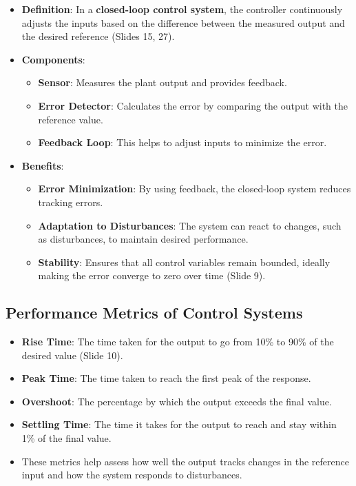 \documentclass[
  14pt,
  a4paper,
  numbers=noendperiod,
  headinclude=true,
  footinclude=true,
  DIV=calc]{scrreprt}
\begin{document}
\begin{itemize}
\item
  \textbf{Definition}: In a \textbf{closed-loop control system}, the
  controller continuously adjusts the inputs based on the difference
  between the measured output and the desired reference (Slides 15, 27).
\item
  \textbf{Components}:

  \begin{itemize}
  \item
    \textbf{Sensor}: Measures the plant output and provides feedback.
  \item
    \textbf{Error Detector}: Calculates the error by comparing the
    output with the reference value.
  \item
    \textbf{Feedback Loop}: This helps to adjust inputs to minimize the
    error.
  \end{itemize}
\item
  \textbf{Benefits}:

  \begin{itemize}
  \item
    \textbf{Error Minimization}: By using feedback, the closed-loop
    system reduces tracking errors.
  \item
    \textbf{Adaptation to Disturbances}: The system can react to
    changes, such as disturbances, to maintain desired performance.
  \item
    \textbf{Stability}: Ensures that all control variables remain
    bounded, ideally making the error converge to zero over time (Slide
    9).
  \end{itemize}
\end{itemize}

\subsection{Performance Metrics of Control
Systems}\label{performance-metrics-of-control-systems}

\begin{itemize}
\item
  \textbf{Rise Time}: The time taken for the output to go from 10\% to
  90\% of the desired value (Slide 10).
\item
  \textbf{Peak Time}: The time taken to reach the first peak of the
  response.
\item
  \textbf{Overshoot}: The percentage by which the output exceeds the
  final value.
\item
  \textbf{Settling Time}: The time it takes for the output to reach and
  stay within 1\% of the final value.
\item
  These metrics help assess how well the output tracks changes in the
  reference input and how the system responds to disturbances.
\end{itemize}
\end{document}
